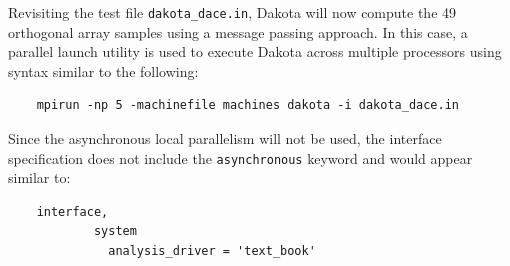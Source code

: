 Revisiting the test file \texttt{dakota\_dace.in}, Dakota will now
compute the 49 orthogonal array samples using a message passing
approach.  In this case, a parallel launch utility is used to execute
Dakota across multiple processors using syntax similar to the following:
\begin{small}
\begin{verbatim}
    mpirun -np 5 -machinefile machines dakota -i dakota_dace.in
\end{verbatim}
\end{small}

Since the asynchronous local parallelism will not be used, the
interface specification does not include the \texttt{asynchronous}
keyword and would appear similar to:
\begin{small}
\begin{verbatim}
    interface,
            system
              analysis_driver = 'text_book'
\end{verbatim}
\end{small}

